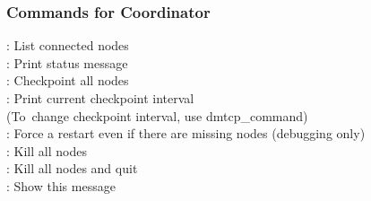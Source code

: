 \subsubsection{Commands for Coordinator}

: List connected nodes\\
: Print status message\\
: Checkpoint all nodes\\
: Print current checkpoint interval\\
\SP\SP\SP(To\ change checkpoint interval, use dmtcp_command)\\
: Force a restart even if there are missing nodes (debugging only)\\
: Kill all nodes\\
: Kill all nodes and quit\\
: Show this message\\
